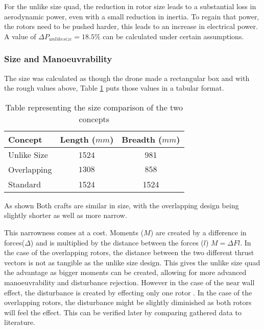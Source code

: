 			For the unlike size quad, the reduction in rotor size leads to a substantial loss in aerodynamic power, even with a small reduction in inertia. To regain that power, the rotors need to be pushed harder, this leads to an increase in electrical power. A value of $\Delta P_{unlike size} = 18.5\%$ can be calculated under certain assumptions.
	
			\subsubsection{Size and Manoeuvrability}
			The size was calculated as though the drone made a rectangular box and with the rough values above, Table \ref{TAB_SizeComparison} puts those values in a tabular format.
			
			\begin{table}[H]
				\centering
				\begin{tabular}{l | c | c }
					Concept & Length ($mm$) & Breadth ($mm$) \\
					\hline\hline
					Unlike Size	   	& 1524 & 981 \\
					Overlapping    & \boldmath$1308$ & \boldmath$858$ \\
					Standard		& 1524 & 1524\\
				\end{tabular}
				\label{TAB_SizeComparison}
				\caption{Table representing the size comparison of the two concepts}
			\end{table}
			
			As shown Both crafts are similar in size, with the overlapping design being slightly shorter as well as more narrow. 
			
			This narrowness comes at a cost. Moments ($M$) are created by a difference in forces($\Delta$) and is multiplied by the distance between the forces ($l$) $M = \Delta Fl $. In the case of the overlapping rotors, the distance between the two different thrust vectors is not as tangible as the unlike size design. This gives the unlike size quad the advantage as bigger moments can be created, allowing for more advanced manoeuvrability and disturbance rejection. However in the case of the near wall effect, the disturbance is created by effecting only one rotor . In the case of the overlapping rotors, the disturbance might be slightly diminished as both rotors will feel the effect. This can be verified later by comparing gathered data to literature. 
	
